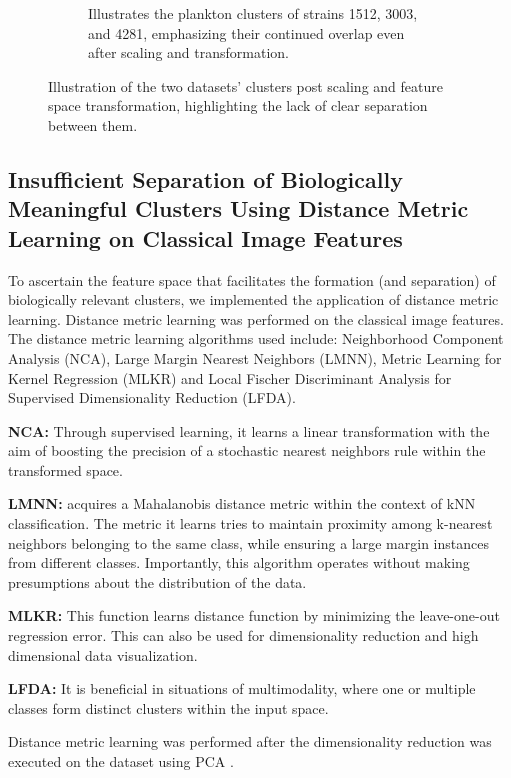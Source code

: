 \documentclass[12pt,a4paper]{article}
\begin{document}
\begin{figure}
\begin{subfigure}{0.5\linewidth}
    \caption{Illustrates the plankton clusters of strains 1512, 3003, and 4281, emphasizing their continued overlap even after scaling and transformation.}
    \label{multifig3:image_b}
  \end{subfigure}
  \caption{Illustration of the two datasets' clusters post scaling and feature space transformation, highlighting the lack of clear separation between them.}
  \label{multifig3:overall_figure}
\end{figure}


\subsection{Insufficient Separation of Biologically Meaningful Clusters Using Distance Metric Learning on Classical Image Features}

To ascertain the feature space that facilitates the formation (and separation) of biologically relevant clusters, we implemented the application of distance metric learning. Distance metric learning was performed on the classical image features. The distance metric learning algorithms used include: Neighborhood Component Analysis (NCA), Large Margin Nearest Neighbors (LMNN), Metric Learning for Kernel Regression (MLKR) and Local Fischer Discriminant Analysis  for Supervised Dimensionality Reduction (LFDA).

\textbf{NCA:} Through supervised learning, it learns a linear transformation with the aim of boosting the precision of a stochastic nearest neighbors rule within the transformed space.

\textbf{LMNN:} acquires a Mahalanobis distance metric within the context of kNN classification. The metric it learns tries to maintain proximity among k-nearest neighbors belonging to the same class, while ensuring a large margin instances from different classes. Importantly, this algorithm operates without making presumptions about the distribution of the data.

\textbf{MLKR:} This function learns distance function by minimizing the leave-one-out regression error. This can also be used for dimensionality reduction and high dimensional data visualization.

\textbf{LFDA:} It is beneficial in situations of multimodality, where one or multiple classes form distinct clusters within the input space.

Distance metric learning was performed after the dimensionality reduction was executed on the dataset using PCA \cite{pca}.
\end{document}

